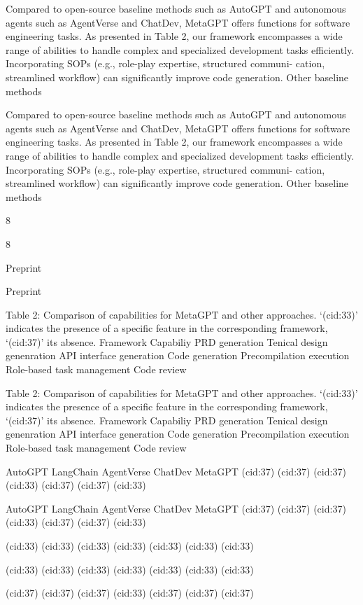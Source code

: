 \documentclass[12pt]{article}
\begin{document}
Compared to open-source baseline methods such as AutoGPT and autonomous agents such as
AgentVerse and ChatDev, MetaGPT offers functions for software engineering tasks. As presented
in Table 2, our framework encompasses a wide range of abilities to handle complex and specialized
development tasks efficiently. Incorporating SOPs (e.g., role-play expertise, structured communi-
cation, streamlined workflow) can significantly improve code generation. Other baseline methods


Compared to open-source baseline methods such as AutoGPT and autonomous agents such as
AgentVerse and ChatDev, MetaGPT offers functions for software engineering tasks. As presented
in Table 2, our framework encompasses a wide range of abilities to handle complex and specialized
development tasks efficiently. Incorporating SOPs (e.g., role-play expertise, structured communi-
cation, streamlined workflow) can significantly improve code generation. Other baseline methods


8


8


Preprint


Preprint


Table 2: Comparison of capabilities for MetaGPT and other approaches. ‘(cid:33)’ indicates the
presence of a specific feature in the corresponding framework, ‘(cid:37)’ its absence.
Framework Capabiliy
PRD generation
Tenical design genenration
API interface generation
Code generation
Precompilation execution
Role-based task management
Code review


Table 2: Comparison of capabilities for MetaGPT and other approaches. ‘(cid:33)’ indicates the
presence of a specific feature in the corresponding framework, ‘(cid:37)’ its absence.
Framework Capabiliy
PRD generation
Tenical design genenration
API interface generation
Code generation
Precompilation execution
Role-based task management
Code review


AutoGPT LangChain AgentVerse ChatDev MetaGPT
(cid:37)
(cid:37)
(cid:37)
(cid:33)
(cid:37)
(cid:37)
(cid:33)


AutoGPT LangChain AgentVerse ChatDev MetaGPT
(cid:37)
(cid:37)
(cid:37)
(cid:33)
(cid:37)
(cid:37)
(cid:33)


(cid:33)
(cid:33)
(cid:33)
(cid:33)
(cid:33)
(cid:33)
(cid:33)


(cid:33)
(cid:33)
(cid:33)
(cid:33)
(cid:33)
(cid:33)
(cid:33)


(cid:37)
(cid:37)
(cid:37)
(cid:33)
(cid:37)
(cid:37)
(cid:37)
\end{document}
